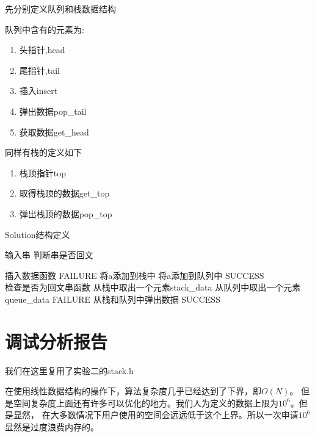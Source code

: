   先分别定义队列和栈数据结构


   队列中含有的元素为:
   \begin{enumerate}
      \item 头指针,head
      \item 尾指针,tail
      \item 插入insert
      \item 弹出数据pop\_tail
      \item 获取数据get\_head
   \end{enumerate}


   同样有栈的定义如下
   \begin{enumerate}
      \item 栈顶指针top
      \item 取得栈顶的数据get\_top
      \item 弹出栈顶的数据pop\_top
   \end{enumerate}

\newpage

\begin{algorithm}[htb] 
   \caption{ Solution结构定义 } 
   \label{alg:Framwork} 
   \begin{algorithmic}[1]
      \Require 输入串
      \Ensure 判断串是否回文
      
      \State 插入数据函数
            \State \Return FAILURE
         \EndIf
         \State 将a添加到栈中
         \State 将a添加到队列中
         \State \Return SUCCESS
      \EndFunction \\

      \State 检查是否为回文串函数
            \State 从栈中取出一个元素stack\_data
            \State 从队列中取出一个元素queue\_data
               \State \Return FAILURE
            \EndIf
            \State 从栈和队列中弹出数据
         \EndWhile
         \State \Return SUCCESS
      \EndFunction
   \end{algorithmic} 
   \end{algorithm}

\newpage

\section{调试分析报告}

   我们在这里复用了实验二的stack.h

在使用线性数据结构的操作下，算法复杂度几乎已经达到了下界，即$O(N)$。
   但是空间复杂度上面还有许多可以优化的地方。我们人为定义的数据上限为$10^6$。但是显然，
   在大多数情况下用户使用的空间会远远低于这个上界。所以一次申请$10^6$显然是过度浪费内存的。


